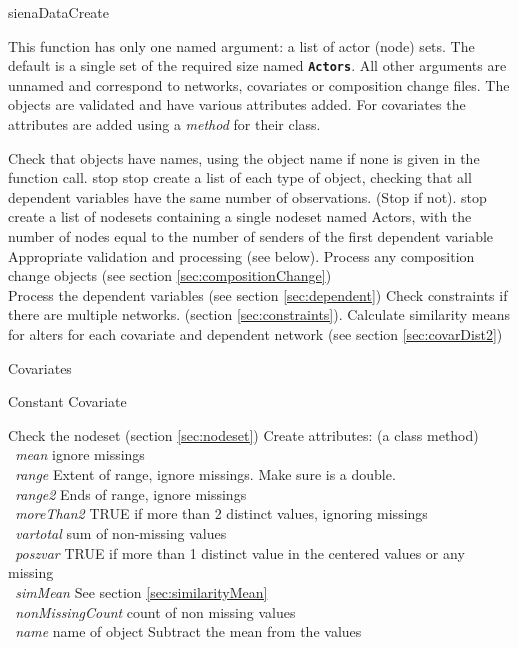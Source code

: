 \documentclass[12pt,a4paper]{article}
\makeatletter
\renewcommand{\=}{\,=\,}
\newcommand{\+}{\,+\,}
\newcommand{\nnm}[1]{\textsf{\small\textit{#1}}}
\renewcommand{\section}{\@startsection{section}{1}
                {0pt}{\baselineskip}{0.5\baselineskip}
                {\centering\sffamily} }
\renewcommand{\subsection}{\@startsection{subsection}{2}
                {0pt}{0.7\baselineskip}{0.3\baselineskip}
                {\sffamily} }
\renewcommand{\subsubsection}{\@startsection{subsubsection}{3}
                {0pt}{0.5\baselineskip}{0.3\baselineskip}
                {\it\sffamily} }
\newcommand{\sfn}[1]{\textbf{\texttt{#1}}}
\makeatother
\begin{document}
\section{sienaDataCreate}

This function has only one named argument: a list of actor (node) sets. The
default is a single set of the required size named \sfn{Actors}. All other
arguments are unnamed and correspond to networks, covariates or composition
change files. The objects are validated and have various attributes
added. For covariates the attributes are added using a \emph{method} for their
class.

\begin{algorithmic}
\STATE Check that objects have names, using the object name if none is given in
the function call.
\STATE stop
\ENDIF
{}
\STATE stop
\ENDIF
\STATE create a list of each type of object, checking that all dependent
variables have the same number of observations. (Stop if not).
\STATE stop
\ENDIF
{}
\STATE create a list of nodesets containing a single
nodeset named Actors, with the number of nodes equal to the number of senders of
the first dependent variable
\ENDIF
{}
\STATE Appropriate validation and processing (see below).
\ENDFOR
\STATE Process any composition change objects (see section
\ref{sec:compositionChange}) \\
\STATE Process the dependent variables (see section \ref{sec:dependent})
\STATE Check constraints if there are multiple networks. (section
\ref{sec:constraints}).
\STATE Calculate similarity means for alters for each covariate and dependent
network (see section \ref{sec:covarDist2})
\end{algorithmic}
\subsection{ Covariates}
\subsubsection{Constant Covariate}
\begin{algorithmic}
\STATE Check the nodeset (section \ref{sec:nodeset})
\STATE Create attributes: (a class method)\\
\sfn{ }\nnm{mean} ignore missings\\
\sfn{ }\nnm{range} Extent of range, ignore missings. Make sure is a double.\\
\sfn{ }\nnm{range2} Ends of range, ignore missings\\
\sfn{ }\nnm{moreThan2} TRUE if more than 2 distinct values, ignoring missings\\
\sfn{ }\nnm{vartotal} sum of non-missing values\\
\sfn{ }\nnm{poszvar} TRUE if more than 1 distinct value in the centered values
or any missing\\
\sfn{ }\nnm{simMean} See section \ref{sec:similarityMean}\\
\sfn{ }\nnm{nonMissingCount} count of non missing values\\
\sfn{ }\nnm{name} name of object
\STATE Subtract the mean from the values
\end{algorithmic}
\end{document}
